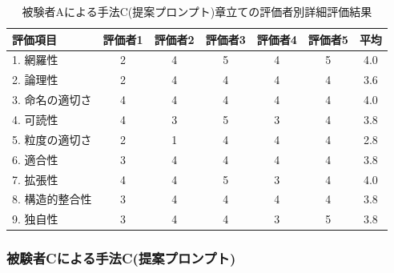 \begin{table}[tp]
  \caption{被験者Aによる手法C(提案プロンプト)章立ての評価者別詳細評価結果}
  \label{tb:cloud_detailed_evaluation_results_C}
  \centering
  \begin{tabular}{|l|c|c|c|c|c|c|}
    \hline
    \textbf{評価項目} & \textbf{評価者1} & \textbf{評価者2} & \textbf{評価者3} & \textbf{評価者4} & \textbf{評価者5} & \textbf{平均} \\
    \hline\hline
    1. 網羅性 & 2 & 4 & 5 & 4 & 5 & 4.0 \\
    \hline
    2. 論理性 & 2 & 4 & 4 & 4 & 4 & 3.6 \\
    \hline
    3. 命名の適切さ & 4 & 4 & 4 & 4 & 4 & 4.0 \\
    \hline
    4. 可読性 & 4 & 3 & 5 & 3 & 4 & 3.8 \\
    \hline
    5. 粒度の適切さ & 2 & 1 & 4 & 4 & 4 & 2.8 \\
    \hline
    6. 適合性 & 3 & 4 & 4 & 4 & 4 & 3.8 \\
    \hline
    7. 拡張性 & 4 & 4 & 5 & 3 & 4 & 4.0 \\
    \hline
    8. 構造的整合性 & 3 & 4 & 4 & 4 & 4 & 3.8 \\
    \hline
    9. 独自性 & 3 & 4 & 4 & 3 & 5 & 3.8 \\
    \hline
  \end{tabular}
\end{table}





\subsubsection{被験者Cによる手法C(提案プロンプト)}

